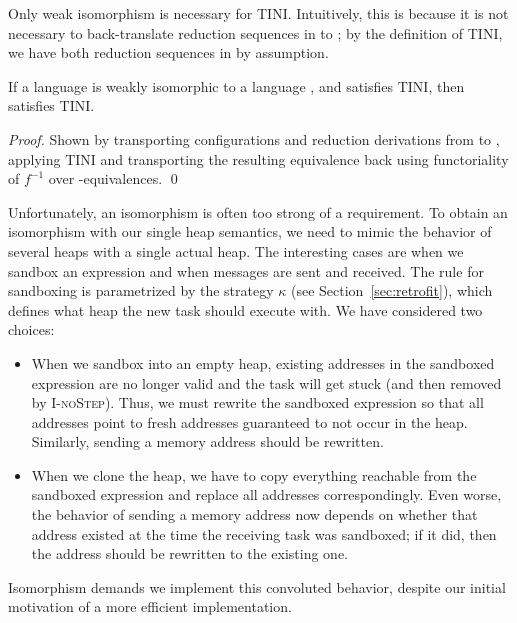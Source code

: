 \documentclass{llncs}
\newcommand{\Varid}[1]{\mathit{#1}}
\begin{document}
Only weak isomorphism is necessary for TINI. Intuitively, this is because
it is not necessary to back-translate reduction sequences in  to
; by the definition of TINI, we have both reduction sequences in 
by assumption.

\begin{theorem}
  \label{thm:iso-tini}
  If a language  is weakly isomorphic to a language , and 
  satisfies TINI, then  satisfies TINI.
\end{theorem}

\begin{proof}
  Shown by transporting configurations and reduction derivations
  from  to , applying TINI and transporting the resulting
  equivalence back using functoriality of \ensuremath{\Varid{f}^{-1}} over -equivalences.
  \qed
\end{proof}

Unfortunately, an isomorphism is often too strong of a requirement.
To obtain an isomorphism with our single heap semantics, we need to mimic the
behavior of several heaps with a single actual heap.
The interesting cases are when we sandbox
an expression and when messages are sent and received.
The rule for sandboxing is
parametrized by the strategy \ensuremath{\kappa} (see Section~\ref{sec:retrofit}),
which defines what heap the new task
should execute with.  We have considered two choices:

\begin{itemize}
    \item When we sandbox into an empty heap, existing addresses
in the sandboxed expression are no longer valid and the
task will get stuck (and then removed by \textsc{I-noStep}).
Thus, we must rewrite the sandboxed expression so that
all addresses point to fresh addresses
guaranteed to not occur in the heap.  Similarly,
sending a memory address should be rewritten.

\item When we clone the heap, we have to copy everything
reachable from the sandboxed expression and replace all addresses
correspondingly.  Even worse, the behavior of sending a memory address
now depends on whether that address existed at the time the receiving
task was sandboxed;  if it did, then the address should be rewritten to the
existing one.
\end{itemize}

Isomorphism demands we implement this convoluted behavior,
despite our initial motivation of a more efficient implementation.
\end{document}
